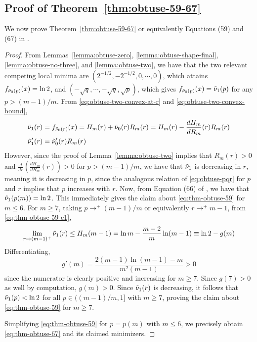 \documentclass[11pt]{article}
\begin{document}
\subsection{Proof of Theorem~\ref{thm:obtuse-59-67}}
We now prove Theorem~\ref{thm:obtuse-59-67} or equivalently Equations (59) and (67) in \citep{holevo2025quantum}. 
\begin{proof}
    From Lemmas~\ref{lemma:obtuse-zero}, \ref{lemma:obtuse-shape-final}, \ref{lemma:obtuse-no-three}, and \ref{lemma:obtuse-two}, we have that the two relevant competing local minima are $(2^{-1/2},-2^{-1/2},0,\cdots,0)$, which attains $f_{{\Tilde \nu_0}(p)}(x)=\ln 2 $, and $(-\sqrt q,\cdots,-\sqrt q,\sqrt p)$, which gives $f_{{\Tilde \nu_0}(p)}(x)= {\Tilde \nu_1}(p)$ for any $p> (m-1)/m$. From \eqref{eq:obtuse-two-convex-at-r} and \eqref{eq:obtuse-two-convex-bound}, 
    \begin{equation}\label{eq:thm-obtuse-59-c1}
    \begin{aligned}
        {\Tilde \nu_1}(r)&=f_{{\Tilde \nu_0}(r)}(x)=H_m(r)+{\Tilde \nu_0}(r) R_m(r)=H_m(r)-\frac{dH_m}{dR_m}(r)R_m(r)\\
        {\Tilde \nu_1}'(r)&={\Tilde \nu_0}'(r)R_m(r)
    \end{aligned}
    \end{equation}
    However, since the proof of Lemma~\ref{lemma:obtuse-two} implies that $R_m(r)>0$ and $\frac{d}{dr}(\frac{dH_m}{dR_m}(r))> 0$ for $p>(m-1)/m$, we have that ${\Tilde \nu_1}$ is decreasing in $r$, meaning it is decreasing in $p$, since the analogous relation of \eqref{eq:obtuse-pqr} for $p$ and $r$ implies that $p$ increases with $r$. Now, from Equation (66) of \citep{holevo2025quantum}, we have that ${\Tilde \nu_1}(p(m))=\ln 2$. This immediately gives the claim about \eqref{eq:thm-obtuse-59} for $m\leq 6$. For $m\geq 7$, taking $p\to^+(m-1)/m$ or equivalently $r\to^+m-1$, from \eqref{eq:thm-obtuse-59-c1},
    \begin{equation}
        \lim_{r\to (m-1)^+}{\Tilde \nu_1}(r)\leq H_m(m-1)=\ln m -\frac{m-2}{m}\ln(m-1)\equiv \ln 2-g(m)
    \end{equation}
    Differentiating,
    \begin{equation}
        g'(m)=\frac{2(m-1)\ln(m-1)-m}{m^2(m-1)}>0
    \end{equation}
    since the numerator is clearly positive and increasing for $m\geq 7$. Since $g(7)>0$ as well by computation, $g(m)>0$. Since ${\Tilde \nu_1}(r)$ is decreasing, it follows that ${\Tilde \nu_1}(p)<\ln 2 $ for all $p\in ((m-1)/m,1]$ with $m\geq 7$, proving the claim about \eqref{eq:thm-obtuse-59} for $m\geq 7$. 

    Simplifying \eqref{eq:thm-obtuse-59} for $p=p(m)$ with $m\leq 6$, we precisely obtain \eqref{eq:thm-obtuse-67} and its claimed minimizers. 
\end{proof}
    
\end{document}

